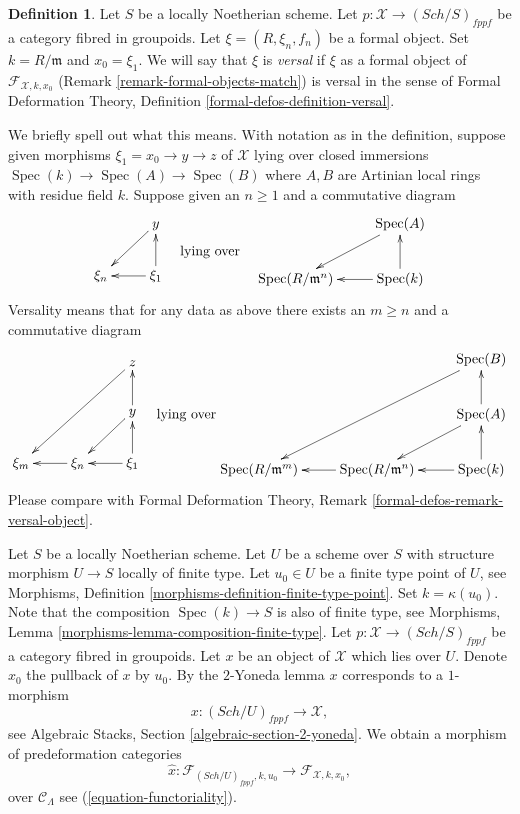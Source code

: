 \documentclass{stacks-project}
\theoremstyle{plain}
\theoremstyle{definition}
\newtheorem{definition}[subsection]{Definition}
\theoremstyle{remark}
\numberwithin{equation}{subsection}
\def\Spec{\mathop{\mathrm{Spec}}}
\def\Sch{\mathit{Sch}}
\begin{document}
\begin{definition}
\label{definition-versal-formal-object}
Let $S$ be a locally Noetherian scheme. Let
$p : \mathcal{X} \to (\Sch/S)_{fppf}$ be a category fibred in groupoids.
Let $\xi = (R, \xi_n, f_n)$ be a formal object. Set $k = R/\mathfrak m$ and
$x_0 = \xi_1$. We will say that $\xi$ is {\it versal} if $\xi$
as a formal object of $\mathcal{F}_{\mathcal{X}, k, x_0}$
(Remark \ref{remark-formal-objects-match}) is versal in the sense
of Formal Deformation Theory, Definition \ref{formal-defos-definition-versal}.
\end{definition}

\noindent
We briefly spell out what this means. With notation as in the definition,
suppose given morphisms $\xi_1 = x_0 \to y \to z$ of $\mathcal{X}$ lying over
closed immersions
$\Spec(k) \to \Spec(A) \to \Spec(B)$
where $A, B$ are Artinian local rings with residue field $k$.
Suppose given an $n \geq 1$ and a commutative diagram
$$
\vcenter{
\xymatrix{
& y \ar[ld] \\
\xi_n & \xi_1 \ar[u] \ar[l]
}
}
\quad\text{lying over}\quad
\vcenter{
\xymatrix{
& \Spec(A) \ar[ld] \\
\Spec(R/\mathfrak m^n) & \Spec(k) \ar[u] \ar[l]
}
}
$$
Versality means that for any data as above
there exists an $m \geq n$ and a commutative diagram
$$
\vcenter{
\xymatrix{
& & z \ar[lldd] \\
& & y \ar[ld] \ar[u] \\
\xi_m & \xi_n \ar[l] & \xi_1 \ar[u] \ar[l]
}
}
\quad\text{lying over}
\vcenter{
\xymatrix{
& & \Spec(B) \ar[lldd] \\
& & \Spec(A) \ar[ld] \ar[u] \\
\Spec(R/\mathfrak m^m) &
\Spec(R/\mathfrak m^n) \ar[l] &
\Spec(k) \ar[u] \ar[l]
}
}
$$
Please compare with Formal Deformation Theory, Remark
\ref{formal-defos-remark-versal-object}.

\medskip\noindent
Let $S$ be a locally Noetherian scheme. Let $U$ be a scheme over $S$
with structure morphism $U \to S$ locally of finite type. Let
$u_0 \in U$ be a finite type point of $U$, see
Morphisms, Definition \ref{morphisms-definition-finite-type-point}.
Set $k = \kappa(u_0)$.
Note that the composition $\Spec(k) \to S$ is also of finite type,
see Morphisms, Lemma \ref{morphisms-lemma-composition-finite-type}.
Let $p : \mathcal{X} \to (\Sch/S)_{fppf}$ be a category fibred in groupoids.
Let $x$ be an object of $\mathcal{X}$ which lies over $U$. Denote $x_0$
the pullback of $x$ by $u_0$. By the $2$-Yoneda lemma $x$ corresponds
to a $1$-morphism
$$
x : (\Sch/U)_{fppf} \longrightarrow \mathcal{X},
$$
see Algebraic Stacks, Section \ref{algebraic-section-2-yoneda}. We obtain a
morphism of predeformation categories
\begin{equation}
\label{equation-hat-x}
\hat x :
\mathcal{F}_{(\Sch/U)_{fppf}, k, u_0}
\longrightarrow
\mathcal{F}_{\mathcal{X}, k, x_0},
\end{equation}
over $\mathcal{C}_\Lambda$ see (\ref{equation-functoriality}).
\end{document}

